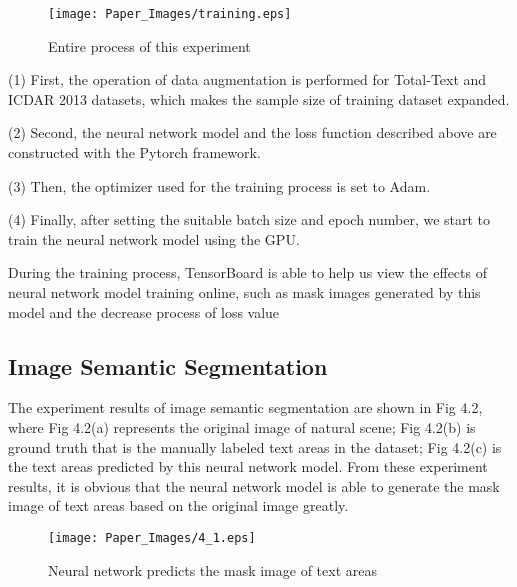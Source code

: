 \documentclass[22pt, UTF8]{article}
\numberwithin{figure}{section}
\numberwithin{table}{section}
\numberwithin{equation}{section} %
\begin{document}
\begin{figure}[htbp]
    \begin{center}
        \texttt{[image: Paper\_Images/training.eps]}
    \end{center}
    \vspace{-3mm} %
    \caption{Entire process of this experiment}
    \vspace{-4mm} %
\end{figure}

\setlength\parindent{2em} (1) First, the operation of data augmentation is performed for Total-Text and ICDAR 2013 datasets, which makes the sample size of training dataset expanded.

\setlength\parindent{2em} (2) Second, the neural network model and the loss function described above are constructed with the Pytorch framework.

\setlength\parindent{2em} (3) Then, the optimizer used for the training process is set to Adam.

\setlength\parindent{2em} (4) Finally, after setting the suitable batch size and epoch number, we start to train the neural network model using the GPU.

\setlength\parindent{2em} During the training process, TensorBoard is able to help us view the effects of neural network model training online, such as mask images generated by this model and the decrease process of loss value

\subsection{Image Semantic Segmentation}

\setlength\parindent{2em} The experiment results of image semantic segmentation are shown in Fig 4.2, where Fig 4.2(a) represents the original image of natural scene; Fig 4.2(b) is ground truth that is the manually labeled text areas in the dataset; Fig 4.2(c) is the text areas predicted by this neural network model. From these experiment results, it is obvious that the neural network model is able to generate the mask image of text areas based on the original image greatly.

\begin{figure}[htbp]
    \begin{center}
        \texttt{[image: Paper\_Images/4\_1.eps]}
    \end{center}
    \vspace{-3mm} %
    \caption{Neural network predicts the mask image of text areas}
    \vspace{-4mm} %
\end{figure}
\end{document}
